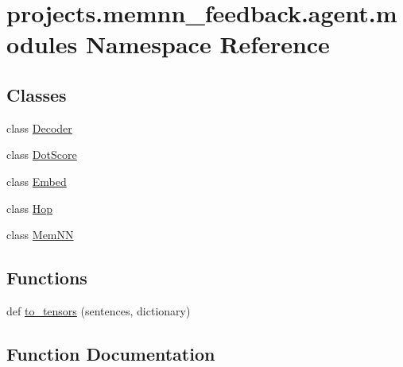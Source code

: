 \hypertarget{namespaceprojects_1_1memnn__feedback_1_1agent_1_1modules}{}\section{projects.\+memnn\+\_\+feedback.\+agent.\+modules Namespace Reference}
\label{namespaceprojects_1_1memnn__feedback_1_1agent_1_1modules}
\subsection*{Classes}
\begin{DoxyCompactItemize}
\item 
class \hyperlink{classprojects_1_1memnn__feedback_1_1agent_1_1modules_1_1Decoder}{Decoder}
\item 
class \hyperlink{classprojects_1_1memnn__feedback_1_1agent_1_1modules_1_1DotScore}{Dot\+Score}
\item 
class \hyperlink{classprojects_1_1memnn__feedback_1_1agent_1_1modules_1_1Embed}{Embed}
\item 
class \hyperlink{classprojects_1_1memnn__feedback_1_1agent_1_1modules_1_1Hop}{Hop}
\item 
class \hyperlink{classprojects_1_1memnn__feedback_1_1agent_1_1modules_1_1MemNN}{Mem\+NN}
\end{DoxyCompactItemize}
\subsection*{Functions}
\begin{DoxyCompactItemize}
\item 
def \hyperlink{namespaceprojects_1_1memnn__feedback_1_1agent_1_1modules_aa0f3493dccc8a3c07b66c48378f14003}{to\+\_\+tensors} (sentences, dictionary)
\end{DoxyCompactItemize}


\subsection{Function Documentation}
\mbox{\label{namespaceprojects_1_1memnn__feedback_1_1agent_1_1modules_aa0f3493dccc8a3c07b66c48378f14003}} 
